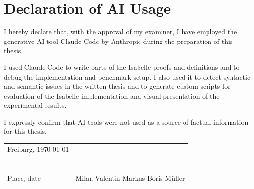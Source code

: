 \newpage
\begingroup
\setlength{\parindent}{0pt}

\section*{Declaration of AI Usage}

\bigskip
\bigskip
\bigskip

I hereby declare that, with the approval of my examiner, I have
employed the generative AI tool Claude Code by Anthropic
during the preparation of this thesis.

I used Claude Code to write parts of the Isabelle proofs and definitions
and to debug the implementation and benchmark setup.
I also used it to detect syntactic and semantic issues in the written thesis
and to generate custom scripts for evaluation of the Isabelle implementation
and visual presentation of the experimental results.

I expressly confirm that AI tools were not used as a
source of factual information for this thesis.

\bigskip
\bigskip
\bigskip
\bigskip
\bigskip
\bigskip

\begin{tabular}{p{} l}
	Freiburg, \today             &                                    \\
	\rule{\textwidth*2/5}{0.4pt} & \rule{\textwidth*2/5}{0.4pt}       \\
	Place, date                  & Milan Valentin Markus Boris Müller
\end{tabular}

\endgroup
